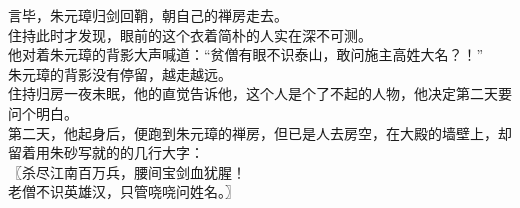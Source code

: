 \begin{multicols}{\theparacolNo}
言毕，朱元璋归剑回鞘，朝自己的禅房走去。\\

住持此时才发现，眼前的这个衣着简朴的人实在深不可测。\\

他对着朱元璋的背影大声喊道：“贫僧有眼不识泰山，敢问施主高姓大名？！”\\

朱元璋的背影没有停留，越走越远。\\

住持归房一夜未眠，他的直觉告诉他，这个人是个了不起的人物，他决定第二天要问个明白。\\

第二天，他起身后，便跑到朱元璋的禅房，但已是人去房空，在大殿的墙壁上，却留着用朱砂写就的的几行大字：\\

〖杀尽江南百万兵，腰间宝剑血犹腥！\\

老僧不识英雄汉，只管哓哓问姓名。〗\\
\ifnum{}
	\end{multicols}
\fi
\newpage
